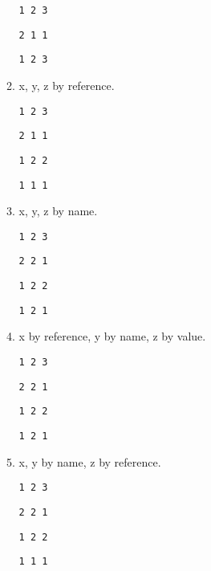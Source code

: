 \documentclass[12pt,letterpaper]{article}
\begin{document}
\begin{enumerate}
\begin{enumerate}
          \texttt{1 2 3}

          \texttt{2 1 1}

          \texttt{1 2 3}

        \item x, y, z by reference.

          \texttt{1 2 3}

          \texttt{2 1 1}

          \texttt{1 2 2}

          \texttt{1 1 1}

        \item x, y, z by name.

          \texttt{1 2 3}

          \texttt{2 2 1}

          \texttt{1 2 2}

          \texttt{1 2 1}

        \item x by reference, y by name, z by value.

          \texttt{1 2 3}

          \texttt{2 2 1}

          \texttt{1 2 2}

          \texttt{1 2 1}

        \item x, y by name, z by reference.

          \texttt{1 2 3}

          \texttt{2 2 1}

          \texttt{1 2 2}

          \texttt{1 1 1}
      \end{enumerate}
  \end{enumerate}
\end{document}
